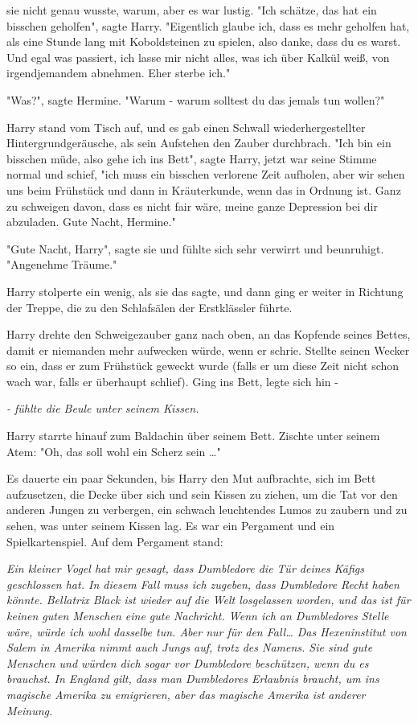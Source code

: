 {sie nicht genau wusste, warum, aber es war lustig. "Ich schätze, das hat ein bisschen geholfen", sagte Harry. "Eigentlich glaube ich, dass es mehr geholfen hat, als eine Stunde lang mit Koboldsteinen zu spielen, also danke, dass du es warst. Und egal was passiert, ich lasse mir nicht alles, was ich über Kalkül weiß, von irgendjemandem abnehmen. Eher sterbe ich."

"Was?", sagte Hermine. "Warum - warum solltest du das jemals tun wollen?"

Harry stand vom Tisch auf, und es gab einen Schwall wiederhergestellter Hintergrundgeräusche, als sein Aufstehen den Zauber durchbrach. "Ich bin ein bisschen müde, also gehe ich ins Bett", sagte Harry, jetzt war seine Stimme normal und schief, "ich muss ein bisschen verlorene Zeit aufholen, aber wir sehen uns beim Frühstück und dann in Kräuterkunde, wenn das in Ordnung ist. Ganz zu schweigen davon, dass es nicht fair wäre, meine ganze Depression bei dir abzuladen. Gute Nacht, Hermine."

"Gute Nacht, Harry", sagte sie und fühlte sich sehr verwirrt und beunruhigt. "Angenehme Träume."

Harry stolperte ein wenig, als sie das sagte, und dann ging er weiter in Richtung der Treppe, die zu den Schlafsälen der Erstklässler führte.

Harry drehte den Schweigezauber ganz nach oben, an das Kopfende seines Bettes, damit er niemanden mehr aufwecken würde, wenn er schrie. Stellte seinen Wecker so ein, dass er zum Frühstück geweckt wurde (falls er um diese Zeit nicht schon wach war, falls er überhaupt schlief). Ging ins Bett, legte sich hin -

\emph{\hfill\break - fühlte die Beule unter seinem Kissen.}

Harry starrte hinauf zum Baldachin über seinem Bett. Zischte unter seinem Atem: "Oh, das soll wohl ein Scherz sein …"

Es dauerte ein paar Sekunden, bis Harry den Mut aufbrachte, sich im Bett aufzusetzen, die Decke über sich und sein Kissen zu ziehen, um die Tat vor den anderen Jungen zu verbergen, ein schwach leuchtendes Lumos zu zaubern und zu sehen, was unter seinem Kissen lag. Es war ein Pergament und ein Spielkartenspiel. Auf dem Pergament stand:

\emph{Ein kleiner Vogel hat mir gesagt, dass Dumbledore die Tür deines Käfigs geschlossen hat. In diesem Fall muss ich zugeben, dass Dumbledore Recht haben könnte. Bellatrix Black ist wieder auf die Welt losgelassen worden, und das ist für keinen guten Menschen eine gute Nachricht. Wenn ich an Dumbledores Stelle wäre, würde ich wohl dasselbe tun. Aber nur für den Fall… Das Hexeninstitut von Salem in Amerika nimmt auch Jungs auf, trotz des Namens. Sie sind gute Menschen und würden dich sogar vor Dumbledore beschützen, wenn du es brauchst. In England gilt, dass man Dumbledores Erlaubnis braucht, um ins magische Amerika zu emigrieren, aber das magische Amerika ist anderer Meinung.}

}
